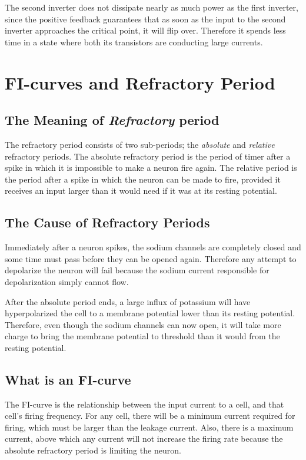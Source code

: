 The second inverter does not dissipate nearly as much power as the first inverter, since the positive feedback guarantees that as soon as the input
to the second inverter approaches the critical point, it will flip over. Therefore it spends less time in a state where both its transistors
are conducting large currents.

\section{FI-curves and Refractory Period}
\subsection{The Meaning of \emph{Refractory} period}
The refractory period consists of two sub-periods; the \emph{absolute} and \emph{relative} refractory periods. The absolute refractory period
is the period of timer after a spike in which it is impossible to make a neuron fire again. The relative period is the period after a 
spike in which the neuron can be made to fire, provided it receives an input larger than it would need if it was at its resting potential.

\subsection{The Cause of Refractory Periods}
Immediately after a neuron spikes, the sodium channels are completely closed and some time must pass before they can be opened again. Therefore
any attempt to depolarize the neuron will fail because the sodium current responsible for depolarization simply cannot flow.

After the absolute period ends, a large influx of potassium will have hyperpolarized the cell to a membrane potential lower than its resting potential.
Therefore, even though the sodium channels can now open, it will take more charge to bring the membrane potential to threshold than it would from the 
resting potential.

\subsection{What is an FI-curve}
The FI-curve is the relationship between the input current to a cell, and that cell's firing frequency. For any cell, there will be a minimum current
required for firing, which must be larger than the leakage current. Also, there is a maximum current, above which any current will not increase the 
firing rate because the absolute refractory period is limiting the neuron.

